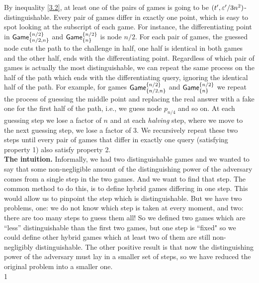 \documentclass{article}
\newcommand{\game}{{\sf Game}}
\newcommand{\dgb}[2]{\game_{\cub{#1}}^{\cub{#2}}}
\def\vaa{0}
\begin{document}
By inequality \ref{3.2}, at least one of the pairs of games is going to be $(t',\varepsilon'/3n^2)$-distinguishable. Every pair of games differ in exactly one point, which is easy to spot looking at the subscript of each game. For instance, the differentiating point in $\dgb{n/2,n}{n/2}$ and $\dgb{n}{n/2}$ is node $n/2$. For each pair of games, the guessed node cuts the path to the challenge in half, one half is identical in both games and the other half, ends with the differentiating point. Regardless of which pair of games is actually the most distinguishable, we can repeat the same process on the half of the path which ends with the differentiating query, ignoring the identical half of the path. For example, for games $\dgb{n/2,n}{n/2}$ and $\dgb{n}{n/2}$ we repeat the process of guessing the middle point and replacing the real answer with a fake one for the first half of the path, i.e., we guess node $p_{n/4}$ and so on. At each guessing step we lose a factor of $n$ and at each \textit{halving} step, where we move to the next guessing step, we lose a factor of $3$. We recursively repeat these two steps until every pair of games that differ in exactly one query (satisfying property 1) also satisfy property 2. \\

  \textbf{The intuition.} Informally, we had two distinguishable games and we wanted to say that some non-negligible amount of the distinguishing power of the adversary comes from a single step in the two games. And we want to find that step. The common method to do this, is to define hybrid games differing in one step. This would allow us to pinpoint the step which is distinguishable. But we have two problems, one: we do not know which step is taken at every moment, and two: there are too many steps to guess them all! So we defined two games which are ``less'' distinguishable than the first two games, but one step is ``fixed" so we could define other hybrid games which at least two of them are still non-negligibly distinguishable. The other positive result is that now the distinguishing power of the adversary must lay in a smaller set of steps, so we have reduced the original problem into a smaller one. \\
\if\vaa1
\end{document}
